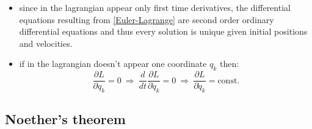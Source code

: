 \begin{itemize}
    \item since in the lagrangian appear only first time derivatives, the differential equations resulting from \eqref{Euler-Lagrange} are second order ordinary differential equations and thus every solution is unique given initial positions and velocities.
    \item if in the lagrangian doesn't appear one coordinate $q_k$ then:
    \begin{equation*}
        \frac{\partial L}{\partial q_k}=0\ \Rightarrow\ \frac{d}{dt}\frac{\partial L}{\partial \dot q_k}=0\ \Rightarrow\ \frac{\partial L}{\partial \dot q_k}=\text{const}.
    \end{equation*}
\end{itemize}
\subsection{Noether's theorem}
